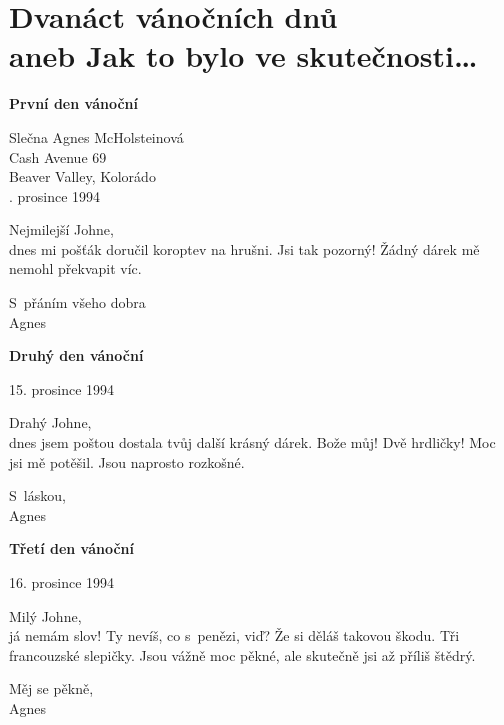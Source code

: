\section{Dvanáct vánočních dnů \\ aneb Jak to bylo ve skutečnosti\ldots}

\noindent
\textbf{První den vánoční} 

\begin{flushright}
Slečna Agnes McHolsteinová \\
Cash Avenue 69 \\
Beaver Valley, Kolorádo \\
. prosince 1994
 \end{flushright}

\noindent
Nejmilejší Johne, \\
dnes mi pošťák doručil koroptev na hrušni. Jsi tak pozorný! Žádný dárek mě nemohl překvapit víc.

\medskip

\noindent
S přáním všeho dobra \\
Agnes

\bigskip

\noindent
\textbf{Druhý den vánoční}

\begin{flushright}
15. prosince 1994 
\end{flushright}

\noindent
Drahý Johne, \\
dnes jsem poštou dostala tvůj další krásný dárek. Bože můj! Dvě hrdličky! Moc jsi mě potěšil. Jsou naprosto rozkošné. 

\medskip

\noindent
S láskou,  \\
Agnes		 

\bigskip

\noindent
\textbf{Třetí den vánoční}

\begin{flushright}
16. prosince 1994 
\end{flushright}

\noindent
Milý Johne,\\
já nemám slov! Ty nevíš, co s penězi, viď? Že si děláš takovou škodu. Tři francouzské slepičky. Jsou vážně moc pěkné, ale skutečně jsi až příliš štědrý.

\medskip

\noindent
Měj se pěkně, \\
Agnes

\bigskip

